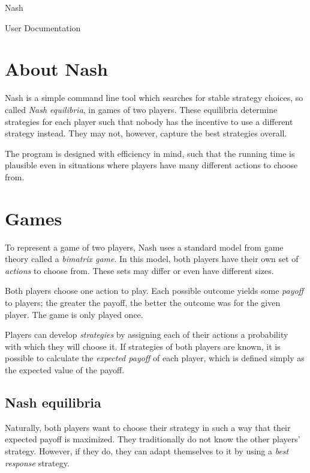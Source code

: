 \documentclass[a4paper,11pt]{article}
\begin{document}
\null
\vspace{4em}
\begin{center}
	{\Huge Nash}
	\vspace{2em}

	{\huge User Documentation}
\end{center}
\pagebreak

\tableofcontents
\pagebreak

\section{About Nash}

Nash is a simple command line tool which searches for stable strategy choices, so called \textit{Nash equilibria}, in games of two players. These equilibria determine strategies for each player such that nobody has the incentive to use a different strategy instead. They may not, however, capture the best strategies overall.

The program is designed with efficiency in mind, such that the running time is plausible even in situations where players have many different actions to choose from.

\section{Games}

To represent a game of two players, Nash uses a standard model from game theory called a \textit{bimatrix game}. In this model, both players have their own set of \textit{actions} to choose from. These sets may differ or even have different sizes.

Both players choose one action to play. Each possible outcome yields some \textit{payoff} to players; the greater the payoff, the better the outcome was for the given player. The game is only played once.

Players can develop \textit{strategies} by assigning each of their actions a probability with which they will choose it. If strategies of both players are known, it is possible to calculate the \textit{expected payoff} of each player, which is defined simply as the expected value of the payoff.

\subsection{Nash equilibria}

Naturally, both players want to choose their strategy in such a way that their expected payoff is maximized. They traditionally do not know the other players' strategy. However, if they do, they can adapt themselves to it by using a \textit{best response} strategy.
\end{document}
